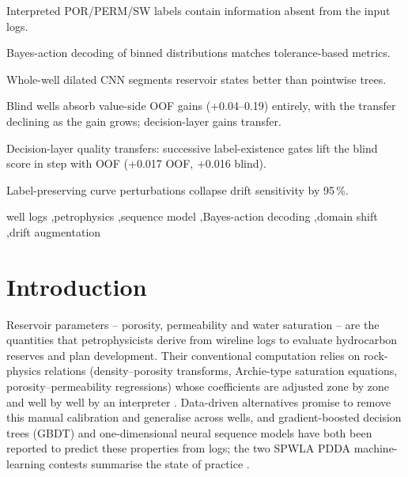 \documentclass[preprint,12pt]{elsarticle}
\begin{document}
\begin{frontmatter}
\begin{abstract}
of 83.9362, whereas every value-morphology amendment is priced downward. At this resolution the blind set rewards the baseline's decision structure and prices value smoothing. The lesson is joint: identifiability bounds what logs carry, tolerance-aligned decoding is required to read it, division of labour beats one-model thinking, and well-level drift is where distribution-aware care outperforms careful models. Code, machine-readable evidence sets, and all per-version prediction artifacts are released.
\end{abstract}

\begin{highlights}
\item Interpreted POR/PERM/SW labels contain information absent from the input logs.
\item Bayes-action decoding of binned distributions matches tolerance-based metrics.
\item Whole-well dilated CNN segments reservoir states better than pointwise trees.
\item Blind wells absorb value-side OOF gains (+0.04--0.19) entirely, with the transfer declining as the gain grows; decision-layer gains transfer.
\item Decision-layer quality transfers: successive label-existence gates lift the blind score in step with OOF (+0.017 OOF, +0.016 blind).
\item Label-preserving curve perturbations collapse drift sensitivity by 95\,\%.
\end{highlights}

\begin{keyword}
well logs \sep petrophysics \sep sequence model \sep Bayes-action decoding \sep domain shift \sep drift augmentation
\end{keyword}

\end{frontmatter}

\linenumbers

\section{Introduction}
\label{sec:intro}

Reservoir parameters -- porosity, permeability and water saturation -- are the quantities that petrophysicists derive from wireline logs to evaluate hydrocarbon reserves and plan development. Their conventional computation relies on rock-physics relations (density--porosity transforms, Archie-type saturation equations, porosity--permeability regressions) whose coefficients are adjusted zone by zone and well by well by an interpreter \cite{archie1942}. Data-driven alternatives promise to remove this manual calibration and generalise across wells, and gradient-boosted decision trees (GBDT) and one-dimensional neural sequence models have both been reported to predict these properties from logs; the two SPWLA PDDA machine-learning contests summarise the state of practice \cite{yu2021sonic,fu2024contest}.
\end{document}
